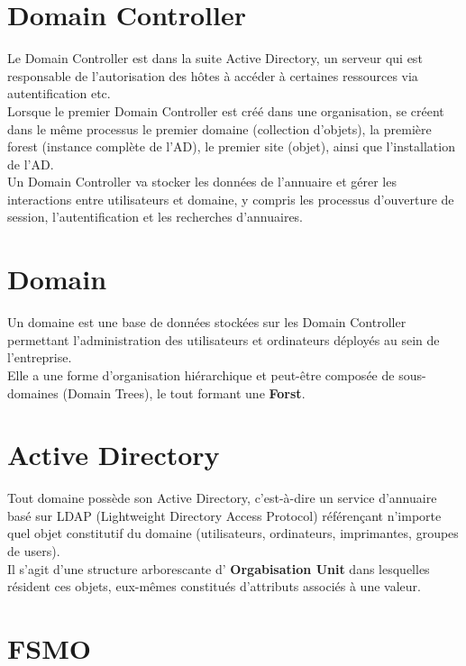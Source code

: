 \documentclass{report}
\begin{document}
	\section{Domain Controller}

		Le Domain Controller est dans la suite Active Directory, un serveur qui est responsable de l'autorisation des hôtes à accéder à certaines ressources via autentification etc.\\

		Lorsque le premier Domain Controller est créé dans une organisation, se créent dans le même processus le premier domaine (collection d'objets), la première forest (instance complète de l'AD), le premier site (objet), ainsi que l'installation de l'AD.\\
		Un Domain Controller va stocker les données de l'annuaire et gérer les interactions entre utilisateurs et domaine, y compris les processus d'ouverture de session, l'autentification et les recherches d'annuaires.\\

	\section{Domain}

		Un domaine est une base de données stockées sur les Domain Controller permettant l'administration des utilisateurs et ordinateurs déployés au sein de l'entreprise.\\
		Elle a une forme d'organisation hiérarchique et peut-être composée de sous-domaines (Domain Trees), le tout formant une \textbf{Forst}.\\

	\section{Active Directory}

		Tout domaine possède son Active Directory, c'est-à-dire un service d'annuaire basé sur LDAP (Lightweight Directory Access Protocol) référençant n'importe quel objet constitutif du domaine (utilisateurs, ordinateurs, imprimantes, groupes de users).\\
		Il s'agit d'une structure arborescante d' \textbf{Orgabisation Unit} dans lesquelles résident ces objets, eux-mêmes constitués d'attributs associés à une valeur.\\

	\section{FSMO}
\end{document}
